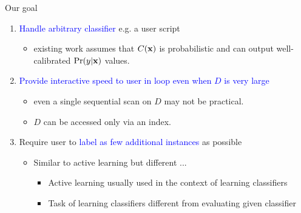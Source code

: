 \documentclass[usenames,dvipsnames, 11pt]{beamer}
\newcommand{\vek}[1]{{\bf {#1}}}
\newcommand{\vx}{{\vek{x}}}
\newlength{\wideitemsep}
\let\olditem\item
\renewcommand{\item}{\setlength{\itemsep}{\wideitemsep}\olditem}
\begin{document}
\begin{frame}{Our goal}
\begin{enumerate}
\pause
\item \textcolor{Blue}{Handle arbitrary classifier} e.g. a user script
  \begin{itemize}
  \item existing work assumes that $C(\vx)$ is probabilistic and can output well-calibrated $\Pr(y|\vx)$ values.
  \end{itemize}
  \pause
\item \textcolor{Blue}{Provide interactive speed to user in loop even when $D$ is very large}
  \begin{itemize}
  \item even a single sequential scan on $D$ may not be practical. 
  \item $D$ can be accessed only via an index.
  \end{itemize}
  \pause
\item Require user to \textcolor{Blue}{label as few additional instances} as possible
  \begin{itemize}
  \item Similar to active learning but different ...
  \begin{itemize}
  \item Active learning usually used in the context of learning classifiers
  \item Task of learning classifiers different from evaluating given classifier
  \end{itemize}
  \end{itemize}
  \end{enumerate}
\end{frame}
\end{document}
